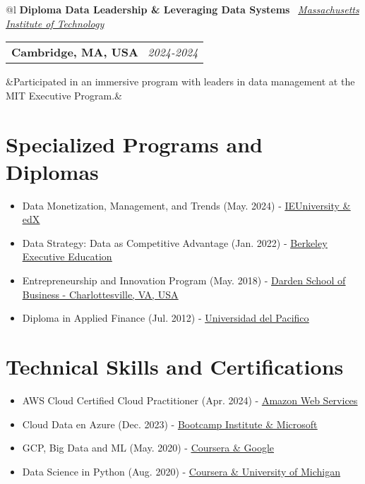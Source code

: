 \documentclass[11pt,a4paper,sans]{moderncv}
\makeatletter
\newcommand*{\customcventry}[7][.13em]{
\begin{tabular}{@{}l}
{\bfseries #4} \
{\itshape #3}
\end{tabular}
\hfill
\begin{tabular}{l@{}}
{\bfseries #5} \
{\itshape #2}
\end{tabular}
\ifx&#7&%
\else{\ %
\begin{minipage}{\maincolumnwidth}%
\small#7%
\end{minipage}}\fi%
\par\addvspace{#1}}
\makeatother
\begin{document}
\customcventry{2024-2024}{\color{blue}\href{https://www.credential.net/f6bd85db-4850-4f50-9609-7990eb0aaadc}{Massachusetts Institute of Technology}}{Diploma Data Leadership & Leveraging Data Systems}{Cambridge, MA, USA}{}{Participated in an immersive program with leaders in data management at the MIT Executive Program.}


\vspace{-0.8em}


\section{Specialized Programs and Diplomas}
{\begin{itemize}[label=\textbullet, itemsep=-0.2em]
\item Data Monetization, Management, and Trends (May. 2024) - \underline{\color{blue}\href{https://courses.edx.org/certificates/447c3529a7dc42aa8bf27297a97b0c88}{IEUniversity \& edX}}
\item Data Strategy: Data as Competitive Advantage (Jan. 2022) - \underline{\color{blue}\href{https://certificates.emeritus.org/39607ed0-10b6-4387-be32-5b34af6a5040}{Berkeley Executive Education}}
\item Entrepreneurship and Innovation Program (May. 2018) - \underline{\color{blue}\href{https://www.credential.net/54b357e1-243e-47ea-a40f-bcfdcfa04b18?username=ronaldfriizmegosolano20070}{Darden School of Business - Charlottesville, VA, USA}}
\item Diploma in Applied Finance (Jul. 2012) - \underline{\color{blue}\href{https://www.credential.net/322f33cb-ee81-453d-994a-3f81db550be9?username=ronaldfriizmegosolano20070}{Universidad del Pacifico}}
\end{itemize}}

\section{Technical Skills and Certifications}
{\begin{itemize}[label=\textbullet, itemsep=-0.2em]
\item AWS Cloud Certified Cloud Practitioner (Apr. 2024) - \underline{\color{blue}\href{https://www.credly.com/badges/b1438ac5-468e-4964-b6ac-2894b7e2204b/linked_in_profile}{Amazon Web Services}}
\item Cloud Data en Azure (Dec. 2023) - \underline{\color{blue}\href{https://www.credential.net/f49190f2-99e2-4af9-83a9-26bef312b87f?username=ronaldfriizmegosolano20070}{Bootcamp Institute \& Microsoft}}
\item GCP, Big Data and ML (May. 2020) - \underline{\color{blue}\href{https://www.coursera.org/account/accomplishments/certificate/RPWJ8S2L8CYW}{Coursera \& Google}}
\item Data Science in Python (Aug. 2020) - \underline{\color{blue}\href{https://www.coursera.org/account/accomplishments/verify/MYX5XU65HP95}{Coursera \& University of Michigan}}
\end{itemize}}
\end{document}
